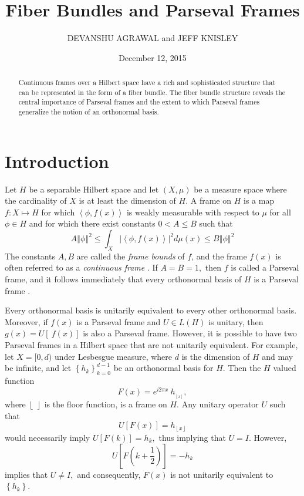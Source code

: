 \documentclass{article}
\title{Fiber Bundles and Parseval Frames}
\author{DEVANSHU AGRAWAL  and JEFF KNISLEY}
\date{December 12, 2015}
\begin{document}
\maketitle

\begin{abstract} Continuous frames over a Hilbert space have a rich and sophisticated structure that can be represented in the form of a fiber bundle.  The fiber bundle structure reveals the central importance of Parseval frames and the extent to which Parseval frames generalize the notion of an orthonormal basis.   \end{abstract}

\section{Introduction}

Let $H$ be a separable Hilbert space and let $\left( X,\mu \right) $ be a measure space where the cardinality of $X$ is at least the dimension of $H.$ A frame on $H$ is a map $f:X\mapsto H$ for which $\left\langle \phi ,f\left( x\right) \right\rangle$ is weakly measurable with respect to $\mu $ for all $\phi \in H$ and for which there exist constants $0<A\leq B$ such that 
$$
A\left\Vert \phi \right\Vert ^{2}\leq \int_{X}\left\vert \left\langle \phi,f\left( x\right) \right\rangle \right\vert ^{2}d\mu \left( x\right) \leq B\left\Vert \phi \right\Vert ^{2} 
$$
The constants $A,B$ are called the \emph{frame bounds} of $f$, and the frame $f(x)$ is often referred to as a \emph{continuous frame} \cite{ali1993continuous, heil1989continuous, rahimi2006continuous}. If $A=B=1,$ then $f$ is called a Parseval frame, and it follows immediately that every orthonormal basis of $H$ is a Parseval frame \cite{ali2014coherent}.  

Every orthonormal basis is unitarily equivalent to every other orthonormal basis. Moreover, if $f\left( x\right)$ is a Parseval frame and $U\in L\left( H\right)$ is unitary, then 
$g\left( x\right) =U\left[ \ f\left( x\right) \right] $ 
is also a Parseval frame. However, it is possible to have two Parseval frames in a Hilbert space that are not unitarily equivalent. For example, let $X=[0,d)$ under Lesbesgue measure, where $d$ is the dimension of $H$ and may be infinite, and let $\left\{ h_{k}\right\} _{k=0}^{d-1}$ be an orthonormal basis for $H.$ Then the $H$ valued function 
$$
F\left( x\right) =e^{i2\pi x}\ h_{_{\left\lfloor x\right\rfloor }}, 
$$
where $\left\lfloor \; \right\rfloor $ is the floor function, is a frame on $H$.  Any unitary operator $U$ such that 
$$
U\left[ F\left( x\right) \right] = h_{\left\lfloor x\right\rfloor }
$$
would necessarily imply $U\left[ F\left( k\right) \right] =h_{k},$ thus implying that $U=I.$ However, 
$$U\left[ F\left( k+\frac{1}{2}\right) \right] =-h_{k}$$
 implies that $U\neq I,$ and consequently, $F\left( x\right) $ is not unitarily equivalent to $\left\{ h_{k}\right\} .$
\end{document}
